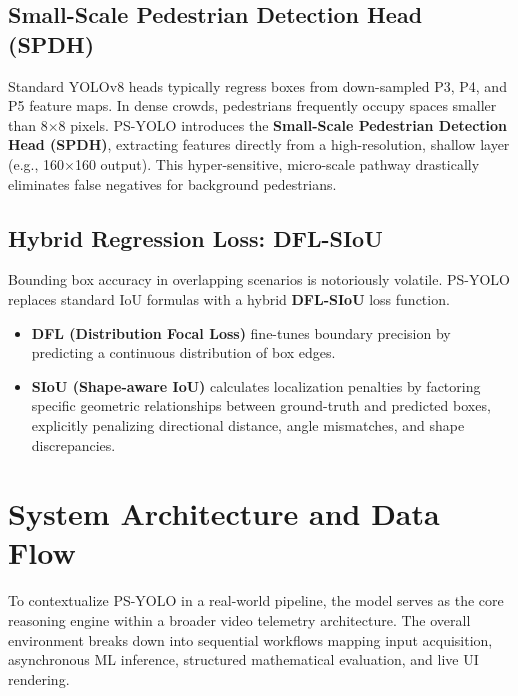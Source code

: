 \documentclass[11pt,a4paper]{article}
\begin{document}
\subsection{Small-Scale Pedestrian Detection Head (SPDH)}
Standard YOLOv8 heads typically regress boxes from down-sampled P3, P4, and P5 feature maps. In dense crowds, pedestrians frequently occupy spaces smaller than 8$\times$8 pixels. PS-YOLO introduces the \textbf{Small-Scale Pedestrian Detection Head (SPDH)}, extracting features directly from a high-resolution, shallow layer (e.g., 160$\times$160 output). This hyper-sensitive, micro-scale pathway drastically eliminates false negatives for background pedestrians.

\subsection{Hybrid Regression Loss: DFL-SIoU}
Bounding box accuracy in overlapping scenarios is notoriously volatile. PS-YOLO replaces standard IoU formulas with a hybrid \textbf{DFL-SIoU} loss function. 
\begin{itemize}
    \item \textbf{DFL (Distribution Focal Loss)} fine-tunes boundary precision by predicting a continuous distribution of box edges.
    \item \textbf{SIoU (Shape-aware IoU)} calculates localization penalties by factoring specific geometric relationships between ground-truth and predicted boxes, explicitly penalizing directional distance, angle mismatches, and shape discrepancies.
\end{itemize}

\section{System Architecture and Data Flow}
To contextualize PS-YOLO in a real-world pipeline, the model serves as the core reasoning engine within a broader video telemetry architecture. The overall environment breaks down into sequential workflows mapping input acquisition, asynchronous ML inference, structured mathematical evaluation, and live UI rendering.
\end{document}
